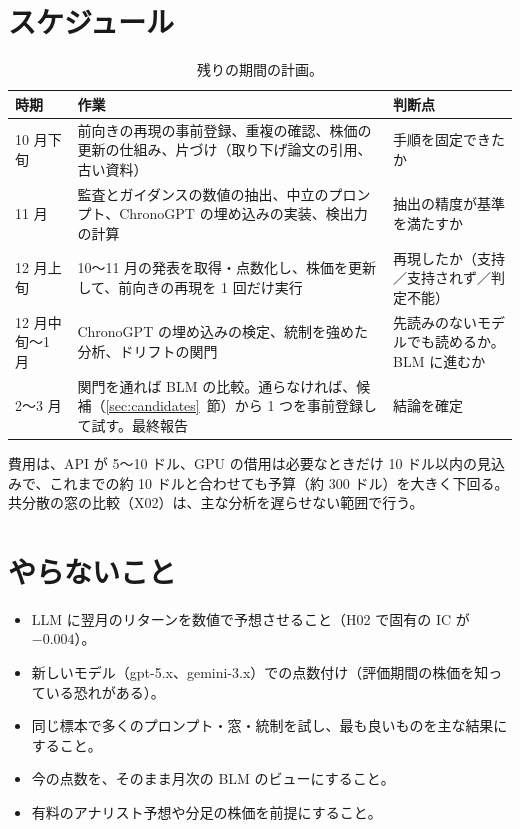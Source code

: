 \documentclass[xelatex,ja=standard,jafont=haranoaji,a4paper,10pt]{bxjsreport}
\newcommand{\secref}[1]{\ref{#1}~節}
\begin{document}
\section{スケジュール}

\begin{table}[H]
\centering
\caption{残りの期間の計画。}
\small
\begin{tabular}{p{2.4cm}p{6.6cm}p{4.6cm}}
\toprule
時期 & 作業 & 判断点 \\
\midrule
10 月下旬 & 前向きの再現の事前登録、重複の確認、株価の更新の仕組み、片づけ（取り下げ論文の引用、古い資料） & 手順を固定できたか \\
11 月 & 監査とガイダンスの数値の抽出、中立のプロンプト、ChronoGPT の埋め込みの実装、検出力の計算 & 抽出の精度が基準を満たすか \\
12 月上旬 & 10〜11 月の発表を取得・点数化し、株価を更新して、前向きの再現を 1 回だけ実行 & 再現したか（支持／支持されず／判定不能） \\
12 月中旬〜1 月 & ChronoGPT の埋め込みの検定、統制を強めた分析、ドリフトの関門 & 先読みのないモデルでも読めるか。BLM に進むか \\
2〜3 月 & 関門を通れば BLM の比較。通らなければ、候補（\secref{sec:candidates}）から 1 つを事前登録して試す。最終報告 & 結論を確定 \\
\bottomrule
\end{tabular}
\end{table}

費用は、API が 5〜10 ドル、GPU の借用は必要なときだけ 10 ドル以内の見込みで、これまでの約 10 ドルと合わせても予算（約 300 ドル）を大きく下回る。共分散の窓の比較（X02）は、主な分析を遅らせない範囲で行う。

\section{やらないこと}

\begin{itemize}
\item LLM に翌月のリターンを数値で予想させること（H02 で固有の IC が $-0.004$）。
\item 新しいモデル（gpt-5.x、gemini-3.x）での点数付け（評価期間の株価を知っている恐れがある）。
\item 同じ標本で多くのプロンプト・窓・統制を試し、最も良いものを主な結果にすること。
\item 今の点数を、そのまま月次の BLM のビューにすること。
\item 有料のアナリスト予想や分足の株価を前提にすること。
\end{itemize}
\end{document}
